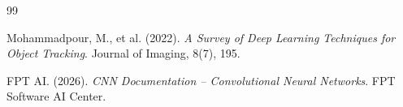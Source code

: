 \documentclass[a4paper,12pt]{article}
\begin{document}
\begin{thebibliography}{99}

Mohammadpour, M., et al. (2022). \textit{A Survey of Deep Learning Techniques for Object Tracking}. Journal of Imaging, 8(7), 195.

FPT AI. (2026). \textit{CNN Documentation -- Convolutional Neural Networks}. FPT Software AI Center.

\end{thebibliography}
\end{document}
